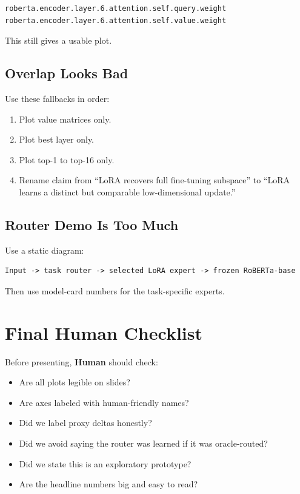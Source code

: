 \documentclass[11pt]{article}
\newcommand{\human}{\textbf{Human}}
\begin{document}
\begin{lstlisting}
roberta.encoder.layer.6.attention.self.query.weight
roberta.encoder.layer.6.attention.self.value.weight
\end{lstlisting}

This still gives a usable plot.

\subsection{Overlap Looks Bad}

Use these fallbacks in order:

\begin{enumerate}[leftmargin=*]
    \item Plot value matrices only.
    \item Plot best layer only.
    \item Plot top-1 to top-16 only.
    \item Rename claim from ``LoRA recovers full fine-tuning subspace'' to ``LoRA learns a distinct but comparable low-dimensional update.''
\end{enumerate}

\subsection{Router Demo Is Too Much}

Use a static diagram:

\begin{lstlisting}
Input -> task router -> selected LoRA expert -> frozen RoBERTa-base
\end{lstlisting}

Then use model-card numbers for the task-specific experts.

\section{Final Human Checklist}

Before presenting, \human{} should check:

\begin{itemize}[leftmargin=*]
    \item Are all plots legible on slides?
    \item Are axes labeled with human-friendly names?
    \item Did we label proxy deltas honestly?
    \item Did we avoid saying the router was learned if it was oracle-routed?
    \item Did we state this is an exploratory prototype?
    \item Are the headline numbers big and easy to read?
\end{itemize}
\end{document}
